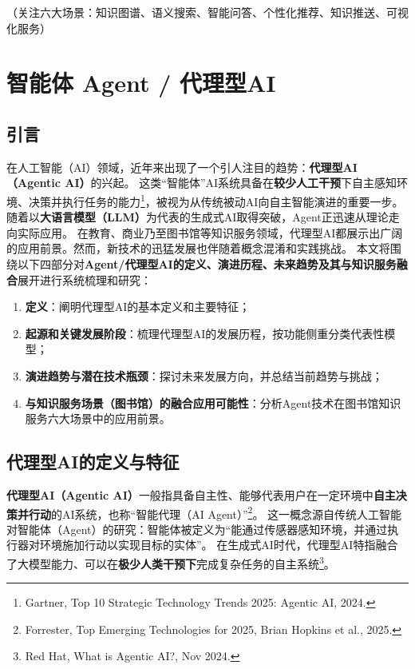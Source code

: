 \documentclass[
  letterpaper,
]{scrbook}
\begin{document}
（关注六大场景：知识图谱、语义搜索、智能问答、个性化推荐、知识推送、可视化服务）

\chapter{智能体 Agent / 代理型AI}\label{sec-agent}

\section{引言}\label{ux5f15ux8a00}

在人工智能（AI）领域，近年来出现了一个引人注目的趋势：\textbf{代理型AI（Agentic
AI）}的兴起。
这类``智能体''AI系统具备在\textbf{较少人工干预}下自主感知环境、决策并执行任务的能力\footnote{Gartner,
  Top 10 Strategic Technology Trends 2025: Agentic AI, 2024.}，被视为从传统被动AI向自主智能演进的重要一步。随着以\textbf{大语言模型（LLM）}为代表的生成式AI取得突破，Agent正迅速从理论走向实际应用。
在教育、商业乃至图书馆等知识服务领域，代理型AI都展示出广阔的应用前景。然而，新技术的迅猛发展也伴随着概念混淆和实践挑战。
本文将围绕以下四部分对\textbf{Agent/代理型AI的定义、演进历程、未来趋势及其与知识服务融合}展开进行系统梳理和研究：

\begin{enumerate}
\def\labelenumi{\arabic{enumi}.}
\item
  \textbf{定义}：阐明代理型AI的基本定义和主要特征；
\item
  \textbf{起源和关键发展阶段}：梳理代理型AI的发展历程，按功能侧重分类代表性模型；
\item
  \textbf{演进趋势与潜在技术瓶颈}：探讨未来发展方向，并总结当前趋势与挑战；
\item
  \textbf{与知识服务场景（图书馆）的融合应用可能性}：分析Agent技术在图书馆知识服务六大场景中的应用前景。
\end{enumerate}

\section{代理型AI的定义与特征}\label{ux4ee3ux7406ux578baiux7684ux5b9aux4e49ux4e0eux7279ux5f81}

\textbf{代理型AI（Agentic
AI）}一般指具备自主性、能够代表用户在一定环境中\textbf{自主决策并行动}的AI系统，也称``智能代理（AI
Agent）''\footnote{Forrester, Top Emerging Technologies for 2025, Brian
  Hopkins et al., 2025.}。
这一概念源自传统人工智能对智能体（Agent）的研究：智能体被定义为``能通过传感器感知环境，并通过执行器对环境施加行动以实现目标的实体''。
在生成式AI时代，代理型AI特指融合了大模型能力、可以在\textbf{极少人类干预下}完成复杂任务的自主系统\footnote{Red
  Hat, What is Agentic AI?, Nov 2024.}。
\end{document}
